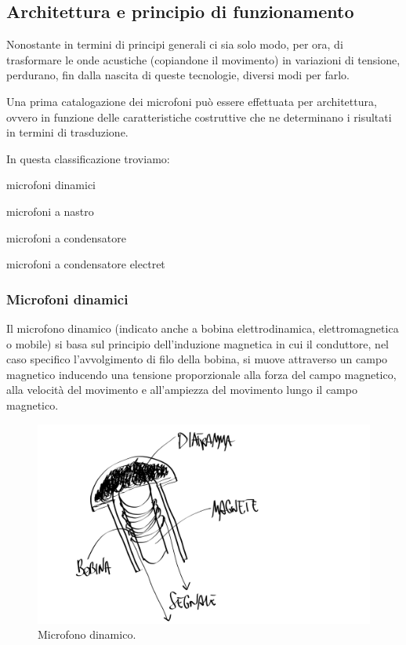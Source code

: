 \begin{refsection}
\subsection{Architettura e principio di funzionamento}

Nonostante in termini di principi generali ci sia solo modo, per ora, di
trasformare le onde acustiche (copiandone il movimento) in variazioni di tensione,
perdurano, fin dalla nascita di queste tecnologie, diversi modi per farlo.

Una prima catalogazione dei microfoni può essere effettuata per architettura,
ovvero in funzione delle caratteristiche costruttive che ne determinano i
risultati in termini di trasduzione.

In questa classificazione troviamo:

\begin{compactitem}
  \item microfoni dinamici
  \item microfoni a nastro
  \item microfoni a condensatore
  \item microfoni a condensatore electret
\end{compactitem}

\subsubsection{Microfoni dinamici}

Il microfono dinamico (indicato anche a bobina elettrodinamica,
elettromagnetica o mobile) si basa sul principio dell'induzione magnetica in cui
il conduttore, nel caso specifico l'avvolgimento di filo della bobina, si muove
attraverso un campo magnetico inducendo una tensione proporzionale alla forza
del campo magnetico, alla velocità del movimento e all'ampiezza del movimento
lungo il campo magnetico.

\begin{figure}[h]
\centering
\includegraphics[width=0.99\columnwidth]{CAPITOLI/0200/img/mic-dinamic.png}
\caption[]{Microfono dinamico.}
\label{mic:dinamico}
\end{figure}


\end{refsection}
